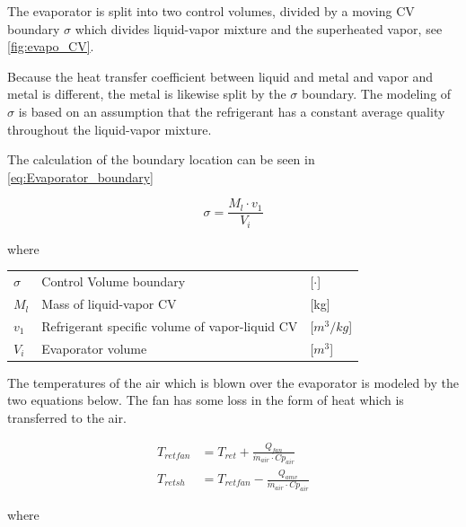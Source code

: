 The evaporator is split into two control volumes, divided by a moving CV boundary $\sigma$ which divides liquid-vapor mixture and the superheated vapor, see \cref{fig:evapo_CV}.

Because the heat transfer coefficient between liquid and metal and vapor and metal is different, the metal is likewise split by the $\sigma$ boundary. The modeling of $\sigma$ is based on an assumption that the refrigerant has a constant average quality throughout the liquid-vapor mixture.

The calculation of the boundary location can be seen in \cref{eq:Evaporator_boundary}

\begin{equation} \label{eq:Evaporator_boundary}
	\sigma = \frac{M_l \cdot v_1}{V_i}
\end{equation}

where

\begin{center}
	\begin{tabular}{l p{8cm} l}
		$\sigma$ & Control Volume boundary                        & [$\cdot$]            \\
		$M_l$    & Mass of liquid-vapor CV                        & [\si{kg}]            \\
		$v_1$    & Refrigerant specific volume of vapor-liquid CV & [$\si{m}^3/\si{kg}$] \\
		$V_i$    & Evaporator volume                              & [$\si{m}^3$]
	\end{tabular}
\end{center}

\medskip
The temperatures of the air which is blown over the evaporator is modeled by the two equations below. The fan has some loss in the form of heat which is transferred to the air.

\begin{align}
	T_{retfan} 		& = T_{ret} + \frac{Q_{fan}}{\dot{m}_{air} \cdot Cp_{air}} 		\label{eq:T_retfan} 		\\
	T_{retsh} 		& = T_{retfan} - \frac{Q_{amv}}{\dot{m}_{air} \cdot Cp_{air}} 	\label{eq:T_retsh}
\end{align}

where

